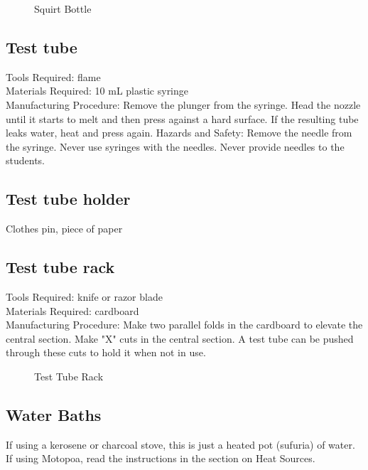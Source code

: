 \begin{figure}[h]
\begin{center}
\def\svgwidth{50pt}

\caption{Squirt Bottle}
\end{center}
\end{figure}

\subsection*{Test tube}
Tools Required: flame\\
Materials Required: 10 mL plastic syringe\\
Manufacturing Procedure: Remove the plunger from the syringe. Head the nozzle until it starts to melt and then press against a hard surface. If the resulting tube leaks water, heat and press again.
Hazards and Safety: Remove the needle from the syringe. Never use syringes with the needles. Never provide needles to the students.

\subsection*{Test tube holder}
Clothes pin, piece of paper

\subsection*{Test tube rack}
Tools Required: knife or razor blade\\
Materials Required: cardboard\\
Manufacturing Procedure: Make two parallel folds in the cardboard to elevate the central section. Make "X" cuts in the central section. A test tube can be pushed through these cuts to hold it when not in use.

\begin{figure}[h]
\begin{center}
\def\svgwidth{150pt}

\caption{Test Tube Rack}
\end{center}
\end{figure}

\subsection*{Water Baths}
If using a kerosene or charcoal stove, this is just a heated pot (sufuria) of water. If using Motopoa, read the instructions in the section on Heat Sources.